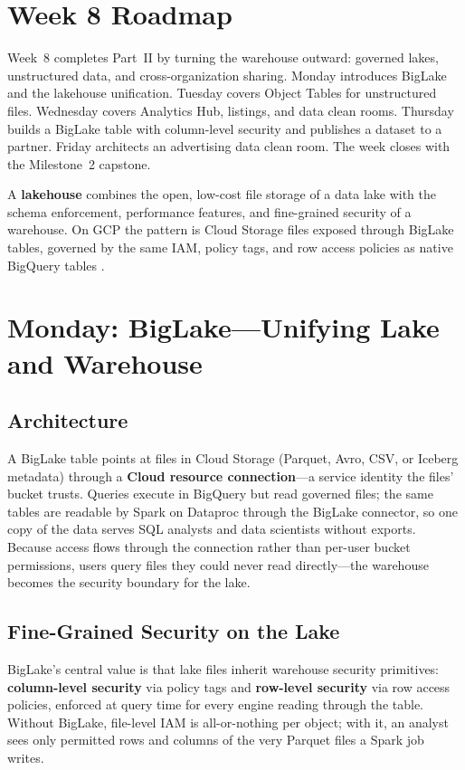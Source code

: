 \section{Week 8 Roadmap}
Week~8 completes Part~II by turning the warehouse outward: governed lakes, unstructured data, and cross-organization sharing. Monday introduces BigLake and the lakehouse unification. Tuesday covers Object Tables for unstructured files. Wednesday covers Analytics Hub, listings, and data clean rooms. Thursday builds a BigLake table with column-level security and publishes a dataset to a partner. Friday architects an advertising data clean room. The week closes with the Milestone~2 capstone.

\begin{definitionbox}
A \textbf{lakehouse} combines the open, low-cost file storage of a data lake with the schema enforcement, performance features, and fine-grained security of a warehouse. On GCP the pattern is Cloud Storage files exposed through BigLake tables, governed by the same IAM, policy tags, and row access policies as native BigQuery tables \cite{googlecloudbiglake}.
\end{definitionbox}

\section{Monday: BigLake---Unifying Lake and Warehouse}

\subsection{Architecture}
A BigLake table points at files in Cloud Storage (Parquet, Avro, CSV, or Iceberg metadata) through a \textbf{Cloud resource connection}---a service identity the files' bucket trusts. Queries execute in BigQuery but read governed files; the same tables are readable by Spark on Dataproc through the BigLake connector, so one copy of the data serves SQL analysts and data scientists without exports. Because access flows through the connection rather than per-user bucket permissions, users query files they could never read directly---the warehouse becomes the security boundary for the lake.

\subsection{Fine-Grained Security on the Lake}
BigLake's central value is that lake files inherit warehouse security primitives: \textbf{column-level security} via policy tags and \textbf{row-level security} via row access policies, enforced at query time for every engine reading through the table. Without BigLake, file-level IAM is all-or-nothing per object; with it, an analyst sees only permitted rows and columns of the very Parquet files a Spark job writes.

